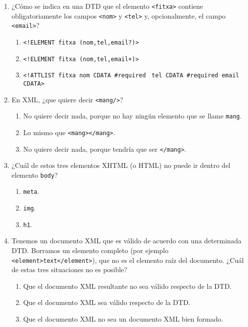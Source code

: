 {\begin{enumerate}
\item ¿Cómo se indica en una DTD que el elemento \verb|<fitxa>| contiene obligatoriamente los campos \verb|<nom>| y \verb|<tel>| y, opcionalmente, el campo \verb|<email>|? \begin{enumerate} \item \verb|<!ELEMENT fitxa (nom,tel,email?)>| \item \verb|<!ELEMENT fitxa (nom,tel,email+)>| \item \verb|<!ATTLIST fitxa nom CDATA #required| \newline\verb| tel CDATA #required email CDATA>| \end{enumerate} 

\item En XML, ¿que quiere decir \texttt{<mang/>}? \begin{enumerate} \item No quiere decir nada, porque no hay ningún elemento que se llame \texttt{mang}. \item Lo mismo que \texttt{<mang></mang>}. \item No quiere decir nada, porque tendría que ser \texttt{</mang>}. \end{enumerate} 

\item ¿Cuál de estos tres elementos XHTML (o HTML) no puede ir dentro del elemento \texttt{body}? \begin{enumerate} \item \texttt{meta}. \item \texttt{img}. \item \texttt{h1}. \end{enumerate} 

\item Tenemos un documento XML que es válido de acuerdo con una determinada DTD. Borramos un elemento completo (por ejemplo \texttt{<element>text</element>}), que no es el elemento raíz del documento. ¿Cuál de estas tres situaciones no es posible? \begin{enumerate} \item Que el documento XML resultante no sea válido respecto de la DTD. \item Que el documento XML sea válido respecto de la DTD. \item Que el documento XML no sea un documento XML bien formado. \end{enumerate} 


\end{enumerate}}
